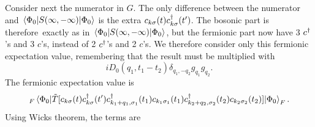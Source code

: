 Consider next the numerator in $G$. The only difference between the numerator and $\ev{S(\infty, -\infty)}{\Phi_0}$ is the extra $c_{ k\sigma}(t)c^{\dagger}_{ k\sigma}(t')$. The bosonic part is therefore\ exactly as in  $\ev{S(\infty, -\infty)}{\Phi_0}$, but the fermionic part now have 3 $c^{\dagger}$'s and 3 $c$'s, instead of 2 $c^{\dagger}$'s and 2 $c$'s.
We therefore consider only this fermionic expectation value, remembering that the result must be multiplied with\begin{equation} 
iD_0(q_1, t_1-t_2)\delta_{q_1, -q_2}g_{q_1}g_{q_2}. 
\end{equation}
The fermionic expectation value is
\begin{equation} 
{}_F\ev{\tilde{T}[c_{k\sigma}(t)c_{k\sigma}^\dagger(t') c_{k_1+q_1, \sigma_1}^\dagger(t_1) c_{k_1\sigma_1}(t_1) c_{k_2+q_2, \sigma_2}^\dagger(t_2) c_{k_2\sigma_2}(t_2)]}{\Phi_0}_F.
\end{equation}
Using Wicks theorem, the terms are
